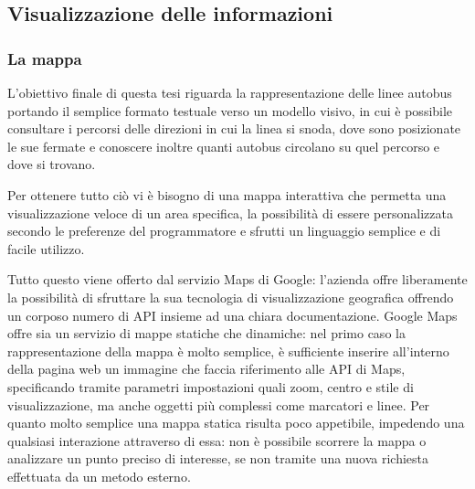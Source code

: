 \newpage

\subsection{Visualizzazione delle informazioni} %
\label{sub:visualizzazione_delle_informazioni}

\subsubsection{La mappa} %
\label{ssub:la_mappa}

L'obiettivo finale di questa tesi riguarda la rappresentazione delle linee autobus portando il semplice formato testuale verso un modello visivo, in cui è possibile consultare i percorsi delle direzioni in cui la linea si snoda, dove sono posizionate le sue fermate e conoscere inoltre quanti autobus circolano su quel percorso e dove si trovano.

Per ottenere tutto ciò vi è bisogno di una mappa interattiva che permetta una visualizzazione veloce di un area specifica, la possibilità di essere personalizzata secondo le preferenze del programmatore e sfrutti un linguaggio semplice e di facile utilizzo.

Tutto questo viene offerto dal servizio Maps di Google: l'azienda offre liberamente la possibilità di sfruttare la sua tecnologia di visualizzazione geografica offrendo un corposo numero di API insieme ad una chiara documentazione.
Google Maps offre sia un servizio di mappe statiche che dinamiche: nel primo caso la rappresentazione della mappa è molto semplice, è sufficiente inserire all'interno della pagina web un immagine che faccia riferimento alle API di Maps, specificando tramite parametri impostazioni quali zoom, centro e stile di visualizzazione, ma anche oggetti più complessi come marcatori e linee.
Per quanto molto semplice una mappa statica risulta poco appetibile, impedendo una qualsiasi interazione attraverso di essa: non è possibile scorrere la mappa o analizzare un punto preciso di interesse, se non tramite una nuova richiesta effettuata da un metodo esterno.

